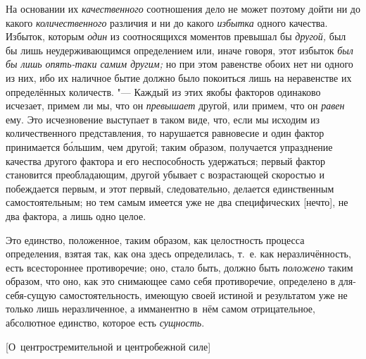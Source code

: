 На основании их {\em качественного} соотношения дело не может поэтому дойти ни
до какого {\em количественного} различия и ни до какого {\em избытка} одного
качества. Избыток, которым {\em один} из соотносящихся моментов превышал бы
{\em другой,} был бы лишь неудерживающимся определением или, иначе говоря, этот
избыток {\em был бы лишь опять-таки самим другим;} но при этом равенстве обоих
нет ни одного из них, ибо их наличное бытие должно было покоиться лишь на
неравенстве их определённых количеств. "--- Каждый из этих якобы факторов
одинаково исчезает, примем ли мы, что он {\em превышает} другой, или примем,
что он {\em равен} ему. Это исчезновение выступает в таком виде, что, если мы
исходим из количественного представления, то нарушается равновесие и один
фактор принимается б\'{о}льшим, чем другой; таким образом, получается
упразднение качества другого фактора и его неспособность удержаться; первый
фактор становится преобладающим, другой убывает с возрастающей скоростью и
побеждается первым, и этот первый, следовательно, делается единственным
самостоятельным; но тем самым имеется уже не два специфических [нечто], не два
фактора, а лишь одно целое.

Это единство, положенное, таким образом, как целостность процесса определения,
взятая так, как она здесь определилась, т.~е. как неразличённость, есть
всестороннее противоречие; оно, стало быть, должно быть {\em положено} таким
образом, что оно, как это снимающее само себя противоречие, определено в
для-себя-сущую самостоятельность, имеющую своей истиной и результатом уже не
только лишь неразличенное, а имманентно в~нём самом отрицательное, абсолютное
единство, которое есть {\em сущность}.

%
{[О~центростремительной и центробежной силе]}

